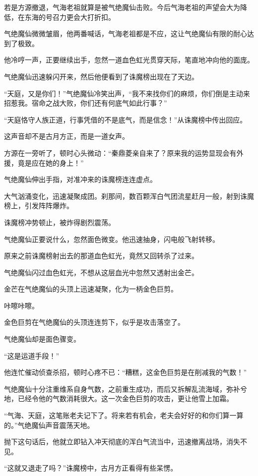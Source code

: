 \begin{this_body}
若是方源撤退，气海老祖就算是被气绝魔仙击败。今后气海老祖的声望会大为降低，在东海的号召力更会大打折扣。

气绝魔仙微微皱眉，他两番喊话，气海老祖都是不应，这让气绝魔仙有限的耐心达到了极致。

他冷哼一声，正要继续出手，忽然一道血色虹光贯穿天际，笔直地冲向他的面庞。

气绝魔仙迅速躲闪开来，然后他便看到了诛魔榜出现在了天边。

“天庭，又是你们！”气绝魔仙冷笑出声，“我不来找你们的麻烦，你们倒是主动来招惹我。宿命之战大败，你们还有何底气如此行事？”

“天庭恪守人族正道，行事凭借的不是底气，而是信念！”从诛魔榜中传出回应。

这声音却不是古月方正，而是一道女声。

方源在一旁听了，顿时心头微动：“秦鼎菱亲自来了？原来我的运势显现会有外援，竟是应在她的身上！”

气绝魔仙伸出手指，对准冲来的诛魔榜连连虚点。

大气汹涌变化，迅速凝聚成团。刹那间，数百颗浑白气团流星赶月一般，射到诛魔榜上，引发阵阵爆炸。

诛魔榜冲势顿止，被炸得剧烈震荡。

气绝魔仙正要说什么，忽然面色微变。他迅速抽身，闪电般飞射转移。

原来之前诛魔榜射出去的那道血色虹光，竟然又回转杀了过来。

气绝魔仙闪过血色虹光，不想从这层血光中忽然又透射出金芒。

金芒在气绝魔仙的头顶上迅速凝聚，化为一柄金色巨剪。

咔嚓咔嚓。

金色巨剪在气绝魔仙的头顶连连剪下，似乎是攻击落空了。

气绝魔仙却是面色骤变。

“这是运道手段！”

他连忙催动侦查杀招，顿时心疼不已：“糟糕，这金色巨剪是在削减我的气数！”

气绝魔仙十分注重维系自身气数，之前重生成功，而后又拆解乱流海域，弥补兮地，已经令他的气数消耗很大。这一次金色巨剪的攻击，更让他雪上加霜。

“气海、天庭，这笔账老夫记下了。将来若有机会，老夫会好好的和你们算一算的。”气绝魔仙声音震荡天地。

抛下这句话后，他就立即钻入冲天彻底的浑白气流当中，迅速撤离战场，消失不见。

“这就又退走了吗？”诛魔榜中，古月方正看得有些呆愣。


\end{this_body}
